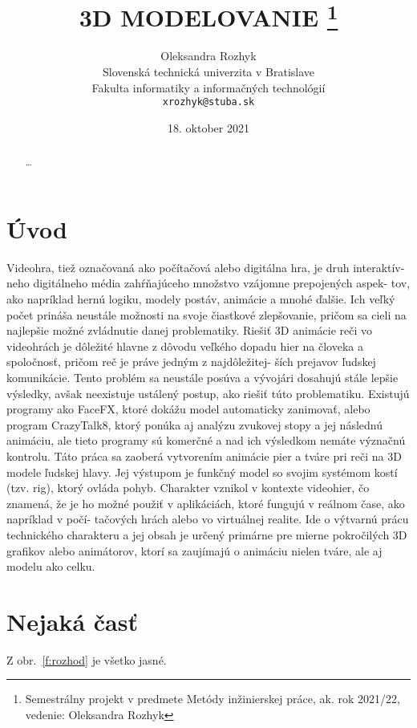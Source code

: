 \documentclass[10pt,twoside,slovak,a4paper]{article}
\title{3D MODELOVANIE \thanks{Semestrálny projekt v predmete Metódy inžinierskej práce, ak. rok 2021/22, vedenie: Oleksandra Rozhyk}} %
\author{Oleksandra Rozhyk\\[2pt]
	{\small Slovenská technická univerzita v Bratislave}\\
	{\small Fakulta informatiky a informačných technológií}\\
	{\small \texttt{xrozhyk@stuba.sk}}
	}
\date{\small 18. oktober 2021} %
\begin{document}
\maketitle

\begin{abstract}
\ldots
\end{abstract}



\section{Úvod}

Videohra, tiež označovaná ako počítačová alebo digitálna hra, je druh interaktív- neho digitálneho média zahŕňajúceho množstvo vzájomne prepojených aspek- tov, ako napríklad hernú logiku, modely postáv, animácie a mnohé ďalšie. Ich veľký počet prináša neustále možnosti na svoje čiastkové zlepšovanie, pričom sa cieli na najlepšie možné zvládnutie danej problematiky.
Riešiť 3D animácie reči vo videohrách je dôležité hlavne z dôvodu veľkého dopadu hier na človeka a spoločnosť, pričom reč je práve jedným z najdôležitej- ších prejavov ľudskej komunikácie. Tento problém sa neustále posúva a vývojári dosahujú stále lepšie výsledky, avšak neexistuje ustálený postup, ako riešiť túto problematiku.
Existujú programy ako FaceFX, ktoré dokážu model automaticky zanimovať, alebo program CrazyTalk8, ktorý ponúka aj analýzu zvukovej stopy a jej následnú animáciu, ale tieto programy sú komerčné a nad ich výsledkom nemáte význačnú kontrolu.
Táto práca sa zaoberá vytvorením animácie pier a tváre pri reči na 3D modele ľudskej hlavy. Jej výstupom je funkčný model so svojim systémom kostí (tzv. rig), ktorý ovláda pohyb. Charakter vznikol v kontexte videohier, čo znamená, že je ho možné použiť v aplikáciách, ktoré fungujú v reálnom čase, ako napríklad v počí- tačových hrách alebo vo virtuálnej realite.
Ide o výtvarnú prácu technického charakteru a jej obsah je určený primárne pre mierne pokročilých 3D grafikov alebo animátorov, ktorí sa zaujímajú o animáciu nielen tváre, ale aj modelu ako celku.



\section{Nejaká časť} \label{nejaka}

Z obr.~\ref{f:rozhod} je všetko jasné.
\end{document}

